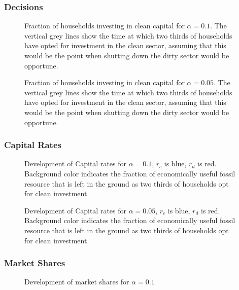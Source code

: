 \subsubsection{Decisions}
\begin{figure}[t]
	\centering
	\caption{Fraction of households investing in clean capital for $\alpha=0.1$. The vertical grey lines show the time at which two thirds of households have opted for investment in the clean sector, assuming that this would be the point when shutting down the dirty sector would be opportune. }
\end{figure}
\begin{figure}[t]
	\centering
	\caption{Fraction of households investing in clean capital for $\alpha=0.05$. The vertical grey lines show the time at which two thirds of households have opted for investment in the clean sector, assuming that this would be the point when shutting down the dirty sector would be opportune. }

\end{figure}
\subsubsection{Capital Rates}
\begin{figure}[t]
	\centering
	\caption{Development of Capital rates for $\alpha=0.1$, $r_c$ is blue, $r_d$ is red. Background color indicates the fraction of economically useful fossil resource that is left in the ground as two thirds of households opt for clean investment.}
	\label{5o2_3}
\end{figure}

\begin{figure}[t]
	\centering
	\caption{Development of Capital rates for $\alpha=0.05$, $r_c$ is blue, $r_d$ is red. Background color indicates the fraction of economically useful fossil resource that is left in the ground as two thirds of households opt for clean investment.}
	\label{5o2_4}
\end{figure}
\subsubsection{Market Shares}
\begin{figure}[t]
	\centering
	\caption{Development of market shares for $\alpha=0.1$}

\end{figure}

